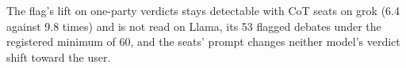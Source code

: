 The flag's lift on one-party verdicts stays detectable with CoT seats on
grok (6.4 against 9.8 times) and is not read on Llama, its 53 flagged
debates under the registered minimum of 60, and the seats' prompt changes
neither model's verdict shift toward the user.
